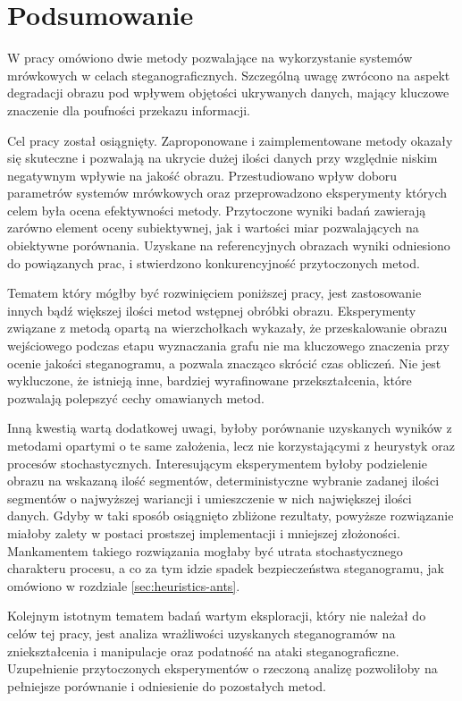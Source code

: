 
\chapter*{Podsumowanie}\label{chap:summary}
{

    W pracy omówiono dwie metody pozwalające na wykorzystanie systemów mrówkowych w celach steganograficznych.
    Szczególną uwagę zwrócono na aspekt degradacji obrazu pod wpływem objętości ukrywanych danych, mający kluczowe
    znaczenie dla poufności przekazu informacji.

    Cel pracy został osiągnięty. Zaproponowane i zaimplementowane metody okazały się skuteczne i pozwalają na ukrycie
    dużej ilości danych przy względnie niskim negatywnym wpływie na jakość obrazu. Przestudiowano wpływ doboru
    parametrów systemów mrówkowych oraz przeprowadzono eksperymenty których celem była ocena efektywności metody.
    Przytoczone wyniki badań zawierają zarówno element oceny subiektywnej, jak i wartości miar pozwalających na
    obiektywne porównania. Uzyskane na referencyjnych obrazach wyniki odniesiono do powiązanych prac, i stwierdzono
    konkurencyjność przytoczonych metod.

    Tematem który mógłby być rozwinięciem poniższej pracy, jest zastosowanie innych bądź większej ilości
    metod wstępnej obróbki obrazu. Eksperymenty związane z metodą opartą na wierzchołkach wykazały, że
    przeskalowanie obrazu wejściowego podczas etapu wyznaczania grafu nie ma kluczowego znaczenia przy ocenie
    jakości steganogramu, a pozwala znacząco skrócić czas obliczeń. Nie jest wykluczone, że istnieją inne, bardziej
    wyrafinowane przekształcenia, które pozwalają polepszyć cechy omawianych metod.

    Inną kwestią wartą dodatkowej uwagi, byłoby porównanie uzyskanych wyników z metodami opartymi o te same założenia,
    lecz nie korzystającymi z heurystyk oraz procesów stochastycznych. Interesującym eksperymentem byłoby podzielenie
    obrazu na wskazaną ilość segmentów, deterministyczne wybranie zadanej ilości segmentów o najwyższej wariancji i
    umieszczenie w nich największej ilości danych. Gdyby w taki sposób osiągnięto zbliżone rezultaty, powyższe
    rozwiązanie miałoby zalety w postaci prostszej implementacji i mniejszej złożoności. Mankamentem takiego rozwiązania
    mogłaby być utrata stochastycznego charakteru procesu, a co za tym idzie spadek bezpieczeństwa steganogramu, jak
    omówiono w rozdziale \ref{sec:heuristics-ants}.

    Kolejnym istotnym tematem badań wartym eksploracji, który nie należał do celów tej pracy, jest analiza wrażliwości
    uzyskanych steganogramów na zniekształcenia i manipulacje oraz podatność na ataki steganograficzne. Uzupełnienie
    przytoczonych eksperymentów o rzeczoną analizę pozwoliłoby na pełniejsze porównanie i odniesienie do pozostałych
    metod.
}
